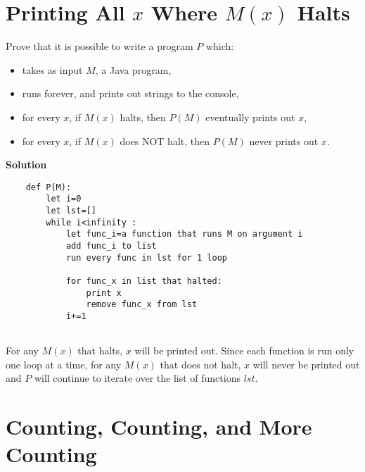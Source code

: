 \documentclass[11pt]{article}
\newcommand*{\Question}[1]{\section{#1}}
\newenvironment{Answer}{\vspace{10pt}\begin{mdframed}\textbf{Solution}\\}{\end{mdframed}\vfill\pagebreak[3]}
\newenvironment{Answer}{\vspace{10pt}}{\vfill\pagebreak[3]}
\begin{document}
 \Question{Printing All $x$ Where $M(x)$ Halts}

Prove that it is possible to write a program $P$ which:
  \begin{itemize}
  \item takes as input $M$, a Java program,
  \item runs forever, and prints out strings to the console,
  \item for every $x$, if $M(x)$ halts, then $P(M)$ eventually prints out $x$,
  \item for every $x$, if $M(x)$ does NOT halt, then $P(M)$ never prints out $x$.
  \end{itemize}

\begin{Answer}
\begin{verbatim}
    def P(M):
        let i=0
        let lst=[]
        while i<infinity :
            let func_i=a function that runs M on argument i 
            add func_i to list
            run every func in lst for 1 loop
            
            for func_x in list that halted:
                print x
                remove func_x from lst
            i+=1
        
\end{verbatim}
For any $M(x)$ that halts, $x$ will be printed out. Since each function is run only one loop at a time, for any $M(x)$ that does not halt, $x$ will never be printed out and $P$ will continue to iterate over the list of functions $lst$.
\end{Answer}

\Question{Counting, Counting, and More Counting}
\end{document}
